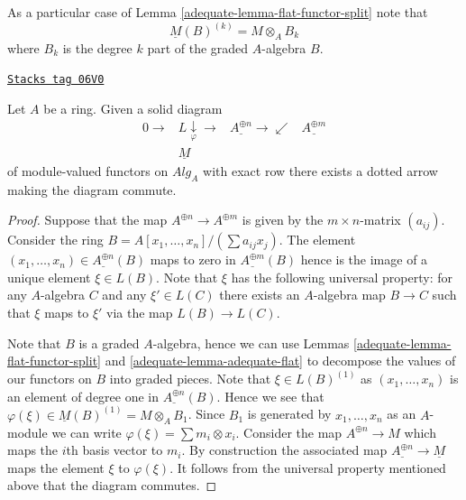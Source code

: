 As a particular case of
Lemma \ref{adequate-lemma-flat-functor-split}
note that
$$
\underline{M}(B)^{(k)} = M \otimes_A B_k
$$
where $B_k$ is the degree $k$ part of the graded $A$-algebra $B$.

\begin{lemma}
\label{adequate-lemma-lift-map}
\href{https://stacks.math.columbia.edu/tag/06V0}{\texttt{Stacks tag 06V0}}

Let $A$ be a ring. Given a solid diagram
$$
\begin{array}{cccc}0 \longrightarrow & L \underset{\varphi}{\downarrow}\longrightarrow & \underline{A^{\oplus n}} \longrightarrow\swarrow & \underline{A^{\oplus m}} \\  & \underline{M} &  & \end{array}
$$
of module-valued functors on $\textit{Alg}_A$
with exact row there exists a dotted arrow making the diagram commute.
\end{lemma}

\begin{proof}

Suppose that the map $A^{\oplus n} \to A^{\oplus m}$ is given by the
$m \times n$-matrix $(a_{ij})$. Consider the ring
$B = A[x_1, \ldots, x_n]/(\sum a_{ij}x_j)$. The element
$(x_1, \ldots, x_n) \in \underline{A^{\oplus n}}(B)$ maps to zero in
$\underline{A^{\oplus m}}(B)$ hence is the image of a unique element
$\xi \in L(B)$. Note that $\xi$ has the following universal property:
for any $A$-algebra $C$ and any $\xi' \in L(C)$ there exists an $A$-algebra
map $B \to C$ such that $\xi$ maps to $\xi'$ via the map $L(B) \to L(C)$.

\medskip\noindent
Note that $B$ is a graded $A$-algebra, hence we can use
Lemmas \ref{adequate-lemma-flat-functor-split} and \ref{adequate-lemma-adequate-flat}
to decompose the values of our functors on $B$ into graded pieces.
Note that $\xi \in L(B)^{(1)}$ as $(x_1, \ldots, x_n)$ is an element
of degree one in $\underline{A^{\oplus n}}(B)$. Hence we see that
$\varphi(\xi) \in \underline{M}(B)^{(1)} = M \otimes_A B_1$.
Since $B_1$ is generated by $x_1, \ldots, x_n$ as an $A$-module we
can write $\varphi(\xi) = \sum m_i \otimes x_i$. Consider the map
$A^{\oplus n} \to M$ which maps the $i$th basis vector to $m_i$.
By construction the associated map
$\underline{A^{\oplus n}} \to \underline{M}$
maps the element $\xi$ to $\varphi(\xi)$. It follows from the
universal property mentioned above that the diagram commutes.
\end{proof}

